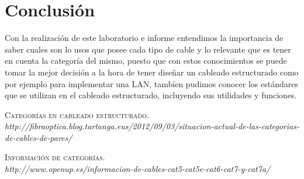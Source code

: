 \documentclass{udpreport}
\begin{document}
\chapter{Conclusión}
    Con la realización de este laboratorio e informe entendimos la importancia de saber cuales son lo usos que posee cada tipo de cable y lo relevante que es tener en cuenta la categoría del mismo, puesto que con estos conocimientos se puede tomar la mejor decisión a la hora de tener diseñar un cableado estructurado como por ejemplo para implementar una LAN, tambíen pudimos conocer los estándares que se utilizan en el cableado estructurado, incluyendo sus utilidades y funciones.
\begin{thebibliography}{x}

 \textsc{Categorías en cableado estructurado}.
\textit{\\http://fibraoptica.blog.tartanga.eus/2012/09/03/situacion-actual-de-las-categorias-de-cables-de-pares/}

 \textsc{Información de categorías}.
\textit{\\http://www.openup.es/informacion-de-cables-cat5-cat5e-cat6-cat7-y-cat7a/}

\end{thebibliography}
\end{document}

